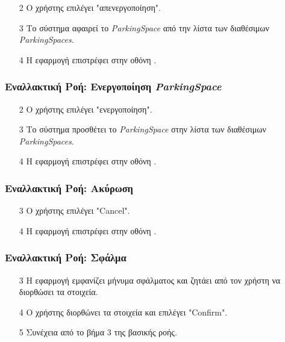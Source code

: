 \begin{enumerate}
    \item[2] Ο χρήστης επιλέγει "απενεργοποίηση".
    \item[3] Το σύστημα αφαιρεί το \textit{ParkingSpace} από την λίστα των
        διαθέσιμων \textit{ParkingSpaces}.
    \item[4] Η εφαρμογή επιστρέφει στην οθόνη .
\end{enumerate}

\subsubsection{Εναλλακτική Ροή: Ενεργοποίηση \textit{ParkingSpace}}

\begin{enumerate}
    \item[2] Ο χρήστης επιλέγει "ενεργοποίηση".
    \item[3] Το σύστημα προσθέτει το \textit{ParkingSpace} στην λίστα των
        διαθέσιμων \textit{ParkingSpaces}.
    \item[4] Η εφαρμογή επιστρέφει στην οθόνη .
\end{enumerate}

\subsubsection{Εναλλακτική Ροή: Ακύρωση}

\begin{enumerate}
    \item[3] Ο χρήστης επιλέγει "Cancel".
    \item[4] Η εφαρμογή επιστρέφει στην οθόνη .
\end{enumerate}

\subsubsection{Εναλλακτική Ροή: Σφάλμα}

\begin{enumerate}
    \item[3] Η εφαρμογή εμφανίζει μήνυμα σφάλματος και ζητάει από τον χρήστη να
        διορθώσει τα στοιχεία.
    \item[4] Ο χρήστης διορθώνει τα στοιχεία και επιλέγει "Confirm".
    \item[5] Συνέχεια από το βήμα 3 της βασικής ροής.
\end{enumerate}
